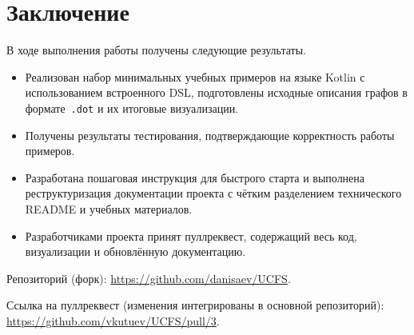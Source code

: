 \documentclass[a4paper]{article}
\begin{document}
\section{Заключение}

В ходе выполнения работы получены следующие результаты.

\begin{itemize}
    \item Реализован набор минимальных учебных примеров на языке Kotlin с использованием встроенного DSL, подготовлены исходные описания графов в формате~\texttt{.dot} и их итоговые визуализации.
    \item Получены результаты тестирования, подтверждающие корректность работы примеров.
    \item Разработана пошаговая инструкция для быстрого старта и выполнена реструктуризация документации проекта с чётким разделением технического README и учебных материалов.
    \item Разработчиками проекта принят пуллреквест, содержащий весь код, визуализации и обновлённую документацию.
\end{itemize}

Репозиторий (форк): \url{https://github.com/danisaev/UCFS}.

Ссылка на пуллреквест (изменения интегрированы в основной репозиторий): \url{https://github.com/vkutuev/UCFS/pull/3}.
\end{document}
